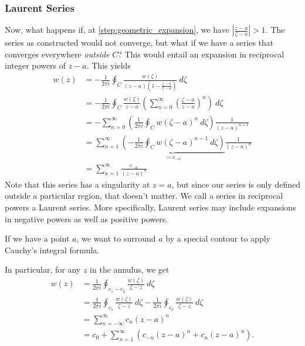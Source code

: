 \documentclass[10pt]{mypackage}
\begin{document}
\subsubsection{Laurent Series}%
Now, what happens if, at \eqref{step:geometric_expansion}, we have $\left\vert \frac{z-a}{\zeta - a} \right\vert > 1$. The series as constructed would not converge, but what if we have a series that converges everywhere \textit{outside} $C$? This would entail an expansion in reciprocal integer powers of $z-a$. This yields
\begin{align*}
  w(z) &= -\frac{1}{2\pi i} \oint_{C}\frac{w\left(\zeta\right)}{\left(z-a\right)\left(1-\frac{\zeta - a}{z-a}\right)}\:d\zeta\\
       &= -\frac{1}{2\pi i} \oint_{C} \frac{w\left(\zeta\right)}{z-a}\left(\sum_{n=0}^{\infty}\left(\frac{\zeta - a}{z-a}\right)^n\right)\:d\zeta\\
       &= -\sum_{n=0}^{\infty}\left(\frac{1}{2\pi i}\oint_{C}w\left(\zeta - a\right)^n\:d\zeta\right)\frac{1}{\left(z-a\right)^{n+1}}\\
       &= \sum_{n=1}^{\infty}\underbrace{\left(-\frac{1}{2\pi i}\oint_{C}w\left(\zeta - a\right)^{n-1}\:d\zeta\right)}_{=c_{-n}}\frac{1}{\left(z-a\right)^{n}}\\
       &= \sum_{n=1}^{\infty}\frac{c_{-n}}{\left(z-a\right)^n}
\end{align*}
Note that this series has a singularity at $z = a$, but since our series is only defined outside a particular region, that doesn't matter. We call a series in reciprocal powers a Laurent series. More specifically, Laurent series may include expansions in negative powers as well as positive powers.
\begin{example}[Annuli]
  If we have a point $a$, we want to surround $a$ by a special contour to apply Cauchy's integral formula.\newline

  In particular, for any $z$ in the annulus, we get
  \begin{align*}
    w(z) &= \frac{1}{2\pi i} \oint_{c_1 - c_2}^{} \frac{w\left( \zeta \right)}{\zeta - z}\:d\zeta\\
         &= \frac{1}{2\pi i} \oint_{c_1}^{} \frac{w\left( \zeta \right)}{\zeta - z}\:d\zeta - \frac{1}{2\pi i}\oint_{c_2}^{} \frac{w\left( \zeta \right)}{\zeta - z}\:d\zeta\\
         &= \sum_{n=-\infty}^{\infty}c_n\left( z-a \right)^n\\
         &= c_0 + \sum_{n=1}^{\infty}\left( c_{-n}\left( z-a \right)^n + c_n\left( z-a \right)^n \right).
  \end{align*}
\end{example}
\end{document}

